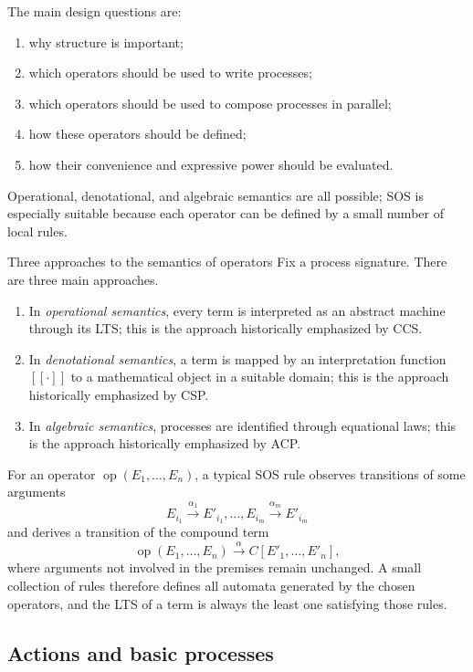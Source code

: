 \documentclass[a4paper]{article}
\newcommand{\sem}[1]{[\![#1]\!]}
\newcommand{\trans}[1]{\xrightarrow{#1}}
\begin{document}
The main design questions are:
\begin{enumerate}
    \item why structure is important;
    \item which operators should be used to write processes;
    \item which operators should be used to compose processes in parallel;
    \item how these operators should be defined;
    \item how their convenience and expressive power should be evaluated.
\end{enumerate}
Operational, denotational, and algebraic semantics are all possible; SOS is especially suitable because each operator can be defined by a small number of local rules.

\begin{snippetexample}{Three approaches to the semantics of operators}
    Fix a process signature. There are three main approaches.
    \begin{enumerate}
        \item In \emph{operational semantics}, every term is interpreted as an abstract machine through its LTS; this is the approach historically emphasized by CCS.
        \item In \emph{denotational semantics}, a term is mapped by an interpretation function \(\sem{\cdot}\) to a mathematical object in a suitable domain; this is the approach historically emphasized by CSP.
        \item In \emph{algebraic semantics}, processes are identified through equational laws; this is the approach historically emphasized by ACP.
    \end{enumerate}
\end{snippetexample}

For an operator \(\operatorname{op}(E_1,\ldots,E_n)\), a typical SOS rule observes transitions of some arguments
\[
    E_{i_1}\trans{\alpha_1}E'_{i_1},\ldots,
    E_{i_m}\trans{\alpha_m}E'_{i_m}
\]
and derives a transition of the compound term
\[
    \operatorname{op}(E_1,\ldots,E_n)
    \trans{\alpha}
    C[E'_1,\ldots,E'_n],
\]
where arguments not involved in the premises remain unchanged.
A small collection of rules therefore defines all automata generated by the chosen operators, and the LTS of a term is always the least one satisfying those rules.

\subsection{Actions and basic processes}
\end{document}
